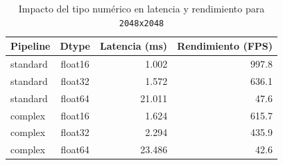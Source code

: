 \begin{table}[htbp]
\centering
\renewcommand{\arraystretch}{1.2}
\setlength{\tabcolsep}{7pt}
\begin{tabular}{|l|c|r|r|}
\hline
\rowcolor[gray]{0.90}
\textbf{Pipeline} & \textbf{Dtype} & \textbf{Latencia (ms)} & \textbf{Rendimiento (FPS)} \\
\hline
standard & float16 & 1.002 & 997.8 \\
\hline
standard & float32 & 1.572 & 636.1 \\
\hline
standard & float64 & 21.011 & 47.6 \\
\hline
complex & float16 & 1.624 & 615.7 \\
\hline
complex & float32 & 2.294 & 435.9 \\
\hline
complex & float64 & 23.486 & 42.6 \\
\hline
\end{tabular}
\caption{Impacto del tipo numérico en latencia y rendimiento para \texttt{2048x2048}}
\label{tab:dtype_latency_fps_equipo1_2048}
\end{table}
